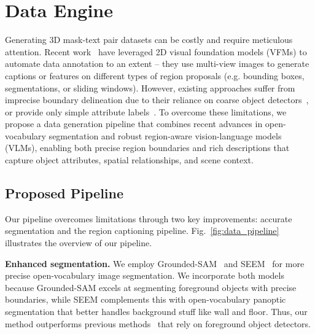 \section{\dataname Data Engine}
\label{sec:caption_generation}

Generating 3D mask-text pair datasets can be costly and require meticulous attention. Recent work~\cite{ding2022pla,yang2024regionplc,jiang2024open} have leveraged 2D visual foundation models (VFMs) to automate data annotation to an extent -- they use multi-view images to generate captions or features on different types of region proposals (e.g. bounding boxes, segmentations, or sliding windows). 
However, existing approaches suffer from imprecise boundary delineation due to their reliance on coarse object detectors~\cite{ding2022pla,yang2024regionplc}, 
or provide only simple attribute labels~\cite{jiang2024open}.
To overcome these limitations, we propose a data generation pipeline that combines recent advances in open-vocabulary segmentation and robust region-aware vision-language models (VLMs), 
enabling both precise region boundaries and rich descriptions that capture object attributes, spatial relationships, and scene context.



\subsection{Proposed Pipeline}
Our pipeline overcomes limitations through two key improvements: accurate segmentation and the region captioning pipeline.
Fig.~\ref{fig:data_pipeline} illustrates the overview of our pipeline.

\noindent\textbf{Enhanced segmentation.}
We employ Grounded-SAM~\cite{ren2024grounded} and SEEM~\cite{zou2024segment} for more precise open-vocabulary image segmentation. We incorporate both models because Grounded-SAM excels at segmenting foreground objects with precise boundaries, while SEEM complements this with open-vocabulary panoptic segmentation that better handles background stuff like wall and floor. Thus, our method outperforms previous methods~\cite{yang2024regionplc,ding2022pla} that rely on foreground object detectors.

